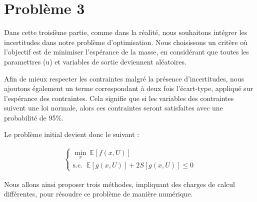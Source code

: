 \documentclass[a4paper, 11pt]{article}
\begin{document}
\section{Problème 3}
Dans cette troisième partie, comme dans la réalité, nous souhaitons intégrer les incertitudes dans notre problème d’optimisation. Nous choisissons un critère où l'objectif est de minimiser l’espérance de la masse, en considérant que toutes les paramettres (u) et variables de sortie deviennent aléatoires.

Afin de mieux respecter les contraintes malgré la présence d’incertitudes, nous ajoutons également un terme correspondant à deux fois l’écart-type, appliqué sur l’espérance des contraintes. Cela signifie que si les variables des contraintes suivent une loi normale, alors ces contraintes seront satisfaites avec une probabilité de 95\%.

Le problème initial devient donc le suivant :


\begin{align}
    \begin{cases}
        \min_{x} \ \mathbb{E}[f(x,U)] \\
        \text{s.c. } \ \mathbb{E}[g(x,U)] + 2S[g(x,U)] \leq 0
    \end{cases}
\end{align}

Nous allons ainsi proposer trois méthodes, impliquant des charges de calcul différentes, pour résoudre ce problème de manière numérique.
\end{document}
